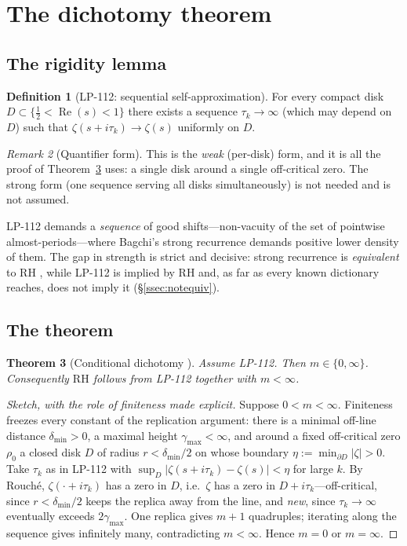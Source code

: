 \documentclass[11pt]{amsart}
\newtheorem{theorem}{Theorem}[section]
\theoremstyle{definition}
\newtheorem{definition}[theorem]{Definition}
\theoremstyle{remark}
\newtheorem{remark}[theorem]{Remark}
\newcommand{\RH}{\mathrm{RH}}
\DeclareMathOperator{\Real}{Re}
\begin{document}
\section{The dichotomy theorem}\label{sec:dichotomy}

\subsection{The rigidity lemma}
\begin{definition}[LP-112: sequential self-approximation]\label{def:lp112}
For every compact disk $D\subset\{\tfrac12<\Real(s)<1\}$ there exists a
sequence $\tau_k\to\infty$ (which may depend on $D$) such that
$\zeta(s+i\tau_k)\to\zeta(s)$ uniformly on $D$.
\end{definition}

\begin{remark}[Quantifier form]
This is the \emph{weak} (per-disk) form, and it is all the proof of
Theorem~\ref{thm:dichotomy} uses: a single disk around a single
off-critical zero. The strong form (one sequence serving all disks
simultaneously) is not needed and is not assumed.
\end{remark}

LP-112 demands a \emph{sequence} of good shifts---non-vacuity of the set of
pointwise almost-periods---where Bagchi's strong recurrence demands
positive lower density of them. The gap in strength is strict and decisive:
strong recurrence is \emph{equivalent} to RH \cite[]{P40}, while
LP-112 is implied by RH and, as far as every known dictionary reaches, does
not imply it (\S\ref{ssec:notequiv}).

\subsection{The theorem}
\begin{theorem}[Conditional dichotomy {\cite[Thm~2.3]{P40}}]
\label{thm:dichotomy}
Assume LP-112. Then $m\in\{0,\infty\}$. Consequently
$\RH$ follows from LP-112 together with $m<\infty$.
\end{theorem}

\begin{proof}[Sketch, with the role of finiteness made explicit]
Suppose $0<m<\infty$. Finiteness freezes every constant of the replication
argument: there is a minimal off-line distance $\delta_{\min}>0$, a maximal
height $\gamma_{\max}<\infty$, and around a fixed off-critical zero
$\rho_0$ a closed disk $D$ of radius $r<\delta_{\min}/2$ on whose boundary
$\eta:=\min_{\partial D}|\zeta|>0$. Take $\tau_k$ as in LP-112 with
$\sup_D|\zeta(s+i\tau_k)-\zeta(s)|<\eta$ for large $k$. By Rouch\'e,
$\zeta(\cdot+i\tau_k)$ has a zero in $D$, i.e.\ $\zeta$ has a zero in
$D+i\tau_k$---off-critical, since $r<\delta_{\min}/2$ keeps the replica
away from the line, and \emph{new}, since $\tau_k\to\infty$ eventually
exceeds $2\gamma_{\max}$. One replica gives $m+1$ quadruples; iterating
along the sequence gives infinitely many, contradicting $m<\infty$. Hence
$m=0$ or $m=\infty$.
\end{proof}
\end{document}
